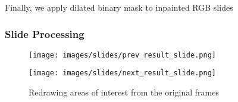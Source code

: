 \begin{frame}

  Finally, we apply dilated binary mask to inpainted RGB slides

  \frametitle{Slide Processing}
  \begin{figure}[ht]
    \begin{minipage}[a]{0.7\linewidth}
        \centering
        \texttt{[image: images/slides/prev\_result\_slide.png]}
    \end{minipage}
    \hspace{0.5cm}
    \begin{minipage}[b]{0.7\linewidth}
        \centering
        \texttt{[image: images/slides/next\_result\_slide.png]}
    \end{minipage}
    \caption{Redrawing areas of interest from the original frames}
    \label{fig:result_frames}
\end{figure}
\end{frame}
